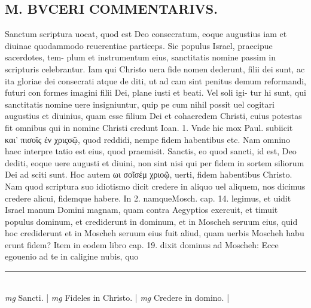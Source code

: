 \documentclass{article}
\begin{document}
\begin{pages}
\section*{M. BVCERI COMMENTARIVS.  }
\marginpar{[ p.19 ]}\pstart Sanctum scriptura uocat, quod est Deo consecratum, eoque augustius iam et diuinae quodammodo reuerentiae particeps.  Sic populus Israel, praecipue sacerdotes, tem- plum et instrumentum eius, sanctitatis nomine passim in scripturis celebrantur.  Iam qui Christo uera fide nomen dederunt, filii dei sunt, ac ita gloriae dei consecrati atque de diti, ut ad cam sint penitus demum reformandi, futuri con formes imagini filii Dei, plane iusti et beati.  Vel soli igi- tur hi sunt, qui sanctitatis nomine uere insigniuntur, quip pe cum nihil possit uel cogitari augustius et diuinius, quam esse filium Dei et cohaeredem Christi, cuius potestas fit omnibus qui in nomine Christi credunt Ioan. 1.  Vnde hic mox Paul.  subiicit και' πισοῖς ἐν χριςσῷ, quod reddidi, nempe fidem habentibus etc. Nam omnino haec interpre tatio est eius, quod praemisit. Sanctis, eo quod sancti, id est, Deo dediti, eoque uere augusti et diuini, non sint nisi qui per fidem in sortem siliorum Dei ad sciti sunt.  \pend\pstart Hoc autem ωι σοῖσέμ χριοῷ, uerti, fidem habentibus Christo.  Nam quod scriptura suo idiotismo dicit credere in aliquo uel aliquem, nos dicimus credere alicui, fidemque habere.  In 2.  namqueMosch.  cap. 14. legimus, et uidit Israel manum Domini magnam, quam contra Aegyptios exercuit, et timuit populus dominum, et crediderunt in dominum, et in Moscheh seruum eius, quid hoc crediderunt et in Moscheh seruum eius fuit aliud, quam uerbis Moscheh habu erunt fidem? Item in eodem libro cap. 19. dixit dominus ad Moscheh: Ecce egouenio ad te in caligine nubis, quo  \pend
\vspace{0.5cm}\noindent
\vspace{0.2cm}\rule{1cm}{0.2pt}\\ 
\hspace{0.2cm}\textit{mg}
\footnotesize Sancti. 
\normalsize| 
\hspace{0.2cm}\textit{mg}
\footnotesize Fideles in Christo. 
\normalsize| 
\hspace{0.2cm}\textit{mg}
\footnotesize Credere in domino. 
\normalsize| 

\end{pages}
\end{document}
